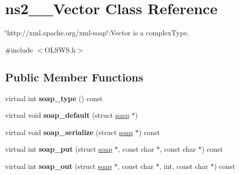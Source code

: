 \hypertarget{classns2____Vector}{
\section{ns2\_\-\_\-Vector Class Reference}
\label{classns2____Vector}
}


\char`\"{}http://xml.apache.org/xml-\/soap\char`\"{}:Vector is a complexType.  




{\ttfamily \#include $<$OLSWS.h$>$}

\subsection*{Public Member Functions}
\begin{DoxyCompactItemize}
\item 
\hypertarget{classns2____Vector_a37a06dae6f6b6c0e49e2ff9bbd4f7251}{
virtual int {\bfseries soap\_\-type} () const }
\label{classns2____Vector_a37a06dae6f6b6c0e49e2ff9bbd4f7251}

\item 
\hypertarget{classns2____Vector_ad388b2fc4e115b33718a3f45acbb78d9}{
virtual void {\bfseries soap\_\-default} (struct \hyperlink{classns2____Vector_ac6009a1d112437a258abd74b37db130f}{soap} $\ast$)}
\label{classns2____Vector_ad388b2fc4e115b33718a3f45acbb78d9}

\item 
\hypertarget{classns2____Vector_afd339b5b71d78bd165c577d502cd06bc}{
virtual void {\bfseries soap\_\-serialize} (struct \hyperlink{classns2____Vector_ac6009a1d112437a258abd74b37db130f}{soap} $\ast$) const }
\label{classns2____Vector_afd339b5b71d78bd165c577d502cd06bc}

\item 
\hypertarget{classns2____Vector_afb83d9495ecb115df540d3a5a378f2e7}{
virtual int {\bfseries soap\_\-put} (struct \hyperlink{classns2____Vector_ac6009a1d112437a258abd74b37db130f}{soap} $\ast$, const char $\ast$, const char $\ast$) const }
\label{classns2____Vector_afb83d9495ecb115df540d3a5a378f2e7}

\item 
\hypertarget{classns2____Vector_a17d587c40c61bda724daa5b95052de89}{
virtual int {\bfseries soap\_\-out} (struct \hyperlink{classns2____Vector_ac6009a1d112437a258abd74b37db130f}{soap} $\ast$, const char $\ast$, int, const char $\ast$) const }
\label{classns2____Vector_a17d587c40c61bda724daa5b95052de89}


\end{DoxyCompactItemize}
